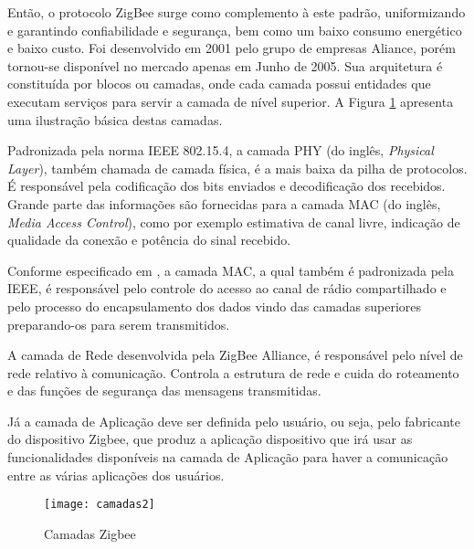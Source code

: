 \documentclass[tcc,capa]{texufpel}
\begin{document}
        Então, o protocolo ZigBee surge como complemento à este padrão, uniformizando e garantindo confiabilidade e segurança, bem como um baixo consumo energético e baixo custo.
        Foi desenvolvido em 2001 pelo grupo de empresas Aliance, porém tornou-se disponível no mercado apenas em Junho de 2005. Sua arquitetura é constituída por blocos ou camadas, onde cada camada possui entidades que executam serviços para servir a camada de nível superior. A Figura \ref{camadaszig} apresenta uma ilustração básica destas camadas.
        
        Padronizada pela norma IEEE 802.15.4, a camada PHY (do inglês, \textit{Physical Layer}), também chamada de camada física, é a mais baixa da pilha de protocolos. É responsável pela codificação dos bits enviados e decodificação dos recebidos. Grande parte das informações são fornecidas para a camada MAC (do inglês, \textit{Media Access Control}), como por exemplo estimativa de canal livre, indicação de qualidade da conexão e potência do sinal recebido.
        
        Conforme especificado em \cite{costa2013evoluccao},
        a camada MAC, a qual também é padronizada pela IEEE, é responsável pelo controle do acesso ao canal de rádio compartilhado e pelo processo do encapsulamento dos dados vindo das camadas superiores preparando-os para serem transmitidos.
        
        A camada de Rede desenvolvida pela ZigBee Alliance, é responsável pelo nível de rede relativo à comunicação. Controla a estrutura de rede e cuida do roteamento e das funções de segurança das mensagens transmitidas.
        
        Já a camada de Aplicação deve ser definida pelo usuário, ou seja, pelo fabricante do dispositivo Zigbee, que produz a aplicação dispositivo que irá usar as funcionalidades disponíveis na camada de Aplicação para haver a comunicação entre as várias aplicações dos usuários.
        
        \begin{figure}[H]
            \centering \texttt{[image: camadas2]}
            \caption{Camadas Zigbee} 
            \label{camadaszig}
        \end{figure}
    
    
        
\end{document}
